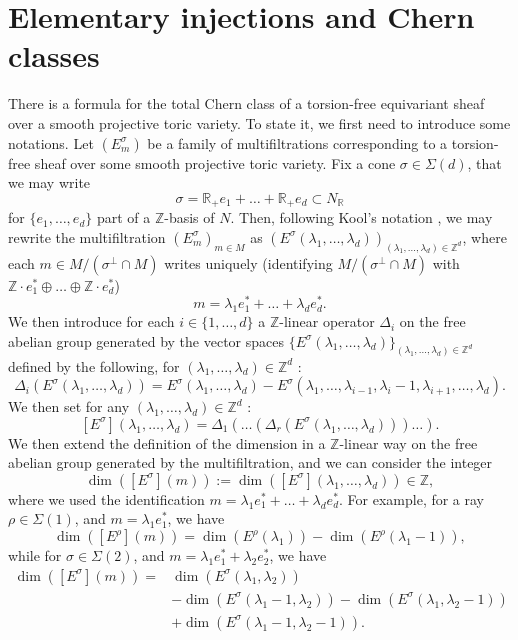 \documentclass[a4paper,10pt]{amsart}
\theoremstyle{plain}{
    \newtheorem{theorem}{Theorem}[section]
    \newtheorem{lemma}[theorem]{Lemma}
    \newtheorem{corollary}[theorem]{Corollary}
    \newtheorem{proposition}[theorem]{Proposition}
    \newtheorem{conjecture}[theorem]{Conjecture}
}
\theoremstyle{definition}{
    \newtheorem{definition}[theorem]{Definition}
    \newtheorem{defn-thm}[theorem]{Definition-Theorem}
    \newtheorem{example}[theorem]{Example}
    \newtheorem{notation}[theorem]{Notation}
}
\theoremstyle{remark}{
    \newtheorem{remark}[theorem]{Remark}
    \newtheorem{problem}[theorem]{Problem}
    \newtheorem{question}[theorem]{Question}
}
\def\R{\mathbb{R}}
\def\Z{\mathbb{Z}}
\begin{document}
\section{Elementary injections and Chern classes}
\label{sec:chern classes elementary}
There is a formula for the total Chern class of a torsion-free equivariant sheaf over a smooth projective toric variety. To state it, we first need to introduce some notations. Let $(E^\sigma_m)$ be a family of multifiltrations corresponding to a torsion-free sheaf over some smooth projective toric variety. Fix a cone $\sigma\in\Sigma(d)$, that we may write $$\sigma=\R_+e_1+\ldots+\R_+e_d\subset N_\R$$ for $\lbrace e_1,\ldots,e_d\rbrace$ part of a $\Z$-basis of $N$. Then, following Kool's notation \cite{Koo11}, we may rewrite the multifiltration $(E^\sigma_m)_{m\in M}$ as $(E^\sigma(\lambda_1,\ldots,\lambda_d))_{(\lambda_1,\ldots,\lambda_d)\in\Z^d}$, where each $m\in M/(\sigma^\perp\cap M)$ writes uniquely (identifying $M/(\sigma^\perp\cap M)$ with $\Z\cdot e_1^*\oplus\ldots\oplus \Z \cdot e_d^*$)
$$
m=\lambda_1e_1^*+\ldots+\lambda_de_d^*.
$$
We then introduce for each $i\in\lbrace 1,\ldots,d\rbrace$ a $\Z$-linear operator $\Delta_i$ on the free abelian group generated by the vector spaces $\lbrace E^\sigma(\lambda_1,\ldots,\lambda_d)\rbrace_{(\lambda_1,\ldots,\lambda_d)\in\Z^d}$ defined by the following, for $(\lambda_1,\ldots,\lambda_d)\in\Z^d$ :
$$
\Delta_i \left(E^\sigma(\lambda_1,\ldots,\lambda_d)\right)=E^\sigma(\lambda_1,\ldots,\lambda_d)-E^\sigma(\lambda_1,\ldots,\lambda_{i-1},\lambda_i-1,\lambda_{i+1},\ldots,\lambda_d).
$$
We then set for any $(\lambda_1,\ldots,\lambda_d)\in\Z^d$ :
$$
[E^\sigma](\lambda_1,\ldots,\lambda_d)=\Delta_1(\ldots(\Delta_r\left(E^\sigma(\lambda_1,\ldots,\lambda_d) \right))\ldots).
$$
We then extend the definition of the dimension in a $\Z$-linear way on the free abelian group generated by the multifiltration, and we can consider the integer
$$
\dim\left( [E^\sigma](m)\right):=\dim\left( [E^\sigma](\lambda_1,\ldots,\lambda_d)\right)\in\Z,
$$
where we used the identification $m=\lambda_1e_1^*+\ldots+\lambda_de_d^*$. For example, for a ray $\rho\in\Sigma(1)$, and $m=\lambda_1e_1^*$, we have
$$
\dim([E^\rho](m)) = \dim( E^\rho(\lambda_1) )- \dim( E^\rho(\lambda_1 -1)),
$$
while for  $\sigma \in \Sigma(2)$, and $m=\lambda_1e_1^*+\lambda_2e_2^*$, we have
\begin{eqnarray*}
\dim( [E^\sigma](m) ) =  &\dim( E^\sigma(\lambda_1, \lambda_2))\\
 & - \dim( E^\sigma(\lambda_1-1, \lambda_2)) - \dim (E^\sigma(\lambda_1, \lambda_2-1))
\\ 
&+ \dim( E^\sigma(\lambda_1-1, \lambda_2-1)).
\end{eqnarray*}
\end{document}
